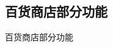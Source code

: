 \documentclass{ctexbeamer}
\begin{document}
\subsection{百货商店部分功能}
\begin{frame}{百货商店部分功能}


\end{frame}






\end{document}
